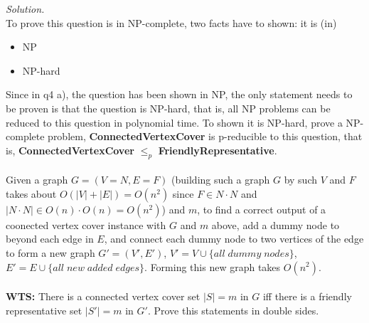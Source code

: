 \documentclass[10pt]{article}
\begin{document}
\begin{mdframed}
        \textit{Solution.}\\
        To prove this question is in NP-complete, two facts have to shown: it is (in)
        \begin{itemize}
            \item NP
            \item NP-hard
        \end{itemize}
        Since in q4 a), the question has been shown in NP, the only statement needs to be proven is that the question is NP-hard, that is, all NP problems can be reduced to this question in polynomial time. To shown it is NP-hard, prove a NP-complete problem, \textbf{ConnectedVertexCover} is p-reducible to this question, that is, \textbf{ConnectedVertexCover} $\leq_p$ \textbf{FriendlyRepresentative}.\\
        \\
        Given a graph $G = (V = N, E = F)$ (building such a graph $G$ by such $V$ and $F$ takes about $O(|V| + |E|) = O(n^2)$ since $F \in N \cdot N$ and $|N \cdot N| \in O(n) \cdot O(n) = O(n^2)$) and $m$, to find a correct output of a coonected vertex cover instance with $G$ and $m$ above, add a dummy node to beyond each edge in $E$, and connect each dummy node to two vertices of the edge to form a new graph $G' = (V', E')$, $V' = V \cup \{all \; dummy \; nodes\}$, $E' = E \cup \{all \; new \; added \; edges\}$. Forming this new graph takes $O(n^2)$.\\
        \\
        \textbf{WTS: }There is a connected vertex cover set $|S| = m$ in $G$ iff there is a friendly representative set $|S'| = m$ in $G'$. Prove this statements in double sides.
        

\end{mdframed}
\end{document}
